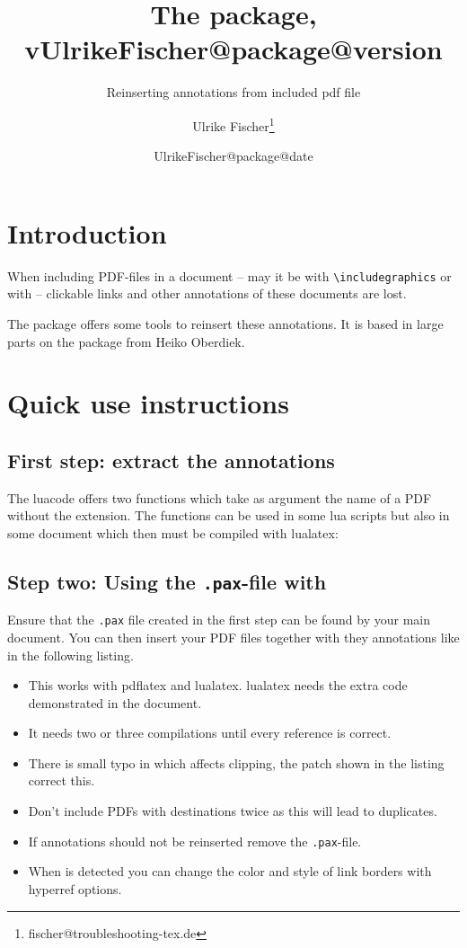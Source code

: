 \documentclass[DIV=12,parskip=half-,bibliography=totoc]{scrartcl}
\title{The \pkg{newpax} package, v\csname UlrikeFischer@package@version\endcsname}
\subtitle{Reinserting annotations from included pdf file}
\date{\csname UlrikeFischer@package@date\endcsname}
\author{Ulrike Fischer\thanks{fischer@troubleshooting-tex.de}}
\begin{document}
\maketitle

\section{Introduction}

When including PDF-files in a document -- may it be with \verb+\includegraphics+ or with \verb++ -- clickable links and other annotations of these documents are lost.

The   package offers some tools to reinsert these annotations. It is based in large parts
on the  package from Heiko Oberdiek.

\section{Quick use instructions}
\subsection{First step: extract the annotations}
The luacode offers two functions which take as argument the name of a PDF without the extension.
The functions can be used in some lua scripts but also in some document which then must be compiled
with lualatex:



\subsection{Step two: Using the \texttt{.pax}-file with }

Ensure that the \texttt{.pax} file created in the first step can be found by your main document. You can then insert your
PDF files together with they annotations like in the following listing.

\begin{itemize}
\item This works with pdflatex and lualatex. lualatex needs the extra code demonstrated in the document.
\item It needs two or three compilations until every reference is correct.
\item There is small typo in  which affects clipping, the patch shown in the listing correct this.
\item Don't include PDFs with destinations twice as this will lead to duplicates.
\item If annotations should not be reinserted remove the \texttt{.pax}-file. 
\item When  is detected you can change the color and style of link borders with hyperref options. 
\end{itemize}
\end{document}
